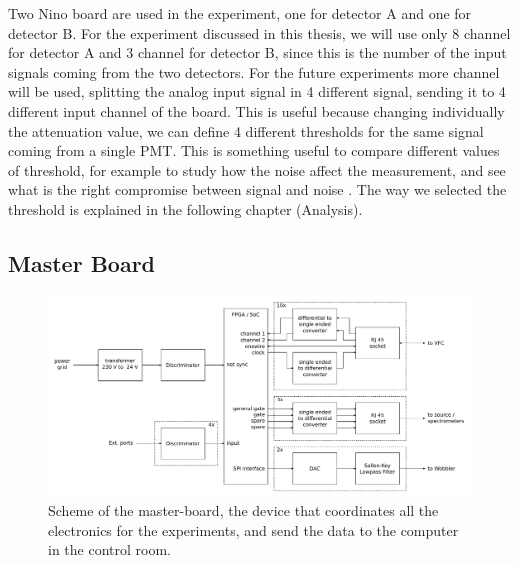Two Nino board are used in the experiment, one for detector A and one for detector B. For the experiment discussed in this thesis, we will use only 8 channel for detector A and 3 channel for detector B, since this is the number of the input signals coming from the two detectors. For the future experiments more channel will be used, splitting the analog input signal in 4 different signal, sending it to 4 different input channel of the board. This is useful because changing individually the attenuation value, we can define 4 different thresholds for the same signal coming from a single PMT. This is something useful to compare different values of threshold, for example to study how the noise affect the measurement, and see what is the right compromise between signal and noise  .
The way we selected the threshold is explained in the following chapter (Analysis).

\subsection{Master Board}

\begin{figure}[hbtp]

\centering
\includegraphics[width = \textwidth]{ExperimentalSetup/masterboard.pdf}
\caption{Scheme of the master-board, the device that coordinates all the electronics for the experiments, and send the data to the computer in the control room.}
\end{figure}

